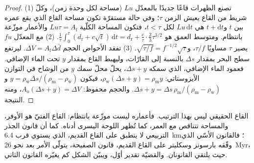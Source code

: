 \begin{proof}
(1) تصنع الظهرات قاعًا جديدًا بالمعدّل $Lu$ (مساحة لكل وحدة زمن)، وكلّ شريط من القاع يعيش
الزمن $\tau$؛ وفي حالة مستقرّة تكون مساحة القاع الذي يقع عمره بين $t$ و$t + \mathrm{d}t$
هي $Lu\,\mathrm{d}t$ لكل $t < \tau$، فتكون المساحة الكلّية $Lu\tau = A_{\text{f}}$
والأعمار موزّعة بانتظام. ومتوسط العمق هو
$\frac1\tau\int_0^\tau (d_{\text{r}} + c\sqrt t)\,\mathrm{d}t = d_{\text{r}} + \frac{c}{\tau}
\cdot\frac23\tau^{3/2}$. (2) مع المعدّل $fu$ يصير $\tau$ مساويًا $\tau/f$،
و$\sqrt{\tau/f} = f^{-1/2}\sqrt\tau$. (3) تفقد الأحواض الحجم $\Delta V = A_{\text{f}}
\Delta\bar d$. ليرتفع سطح البحر بمقدار $\Delta s$ بالنسبة إلى القارّات، وليهبط القاع
بمقدار $y$ تحت الماء الإضافي. فعمود الماء الإضافي، الذي سمكه $\Delta s + y$، يحلّ محلّ
سمك $y$ من الوشاح في التوازن الأيزوستاتي: $\rho_{\text{w}}(\Delta s + y) =
\rho_{\text{m}} y$، فيكون $y = \rho_{\text{w}}\Delta s/(\rho_{\text{m}} - \rho_{\text{w}})$
و$\Delta s + y = \Delta s\,\rho_{\text{m}}/(\rho_{\text{m}} - \rho_{\text{w}})$. والحجم
محفوظ: $A_{\text{o}}(\Delta s + y) = \Delta V$، ومنه النتيجة.
\end{proof}

القاع الحقيقي ليس بهذا الترتيب. فأعماره ليست موزّعة بانتظام: القاع الفتيّ هو الأوفر،
والمساحة تتناقص مع العمر، كما تُظهر اللوحة اليسرى أدناه. كما أن قانون الجذر التربيعي لا ينطبق على
القاع القديم، الذي يستوي قرب \qty{6.4}{km}؛ فالقانون الأسّي الذي وفّقه بارسونز وسكليتر
على القاع القديم، قانون الصفيحة، يتولّى الأمر بعد نحو \qty{26}{Myr}، حيث يلتقي
القانونان. والقضيّة تقدير أوّل، ويبيّن الشكل
كم يغيّره القانون الثاني.

